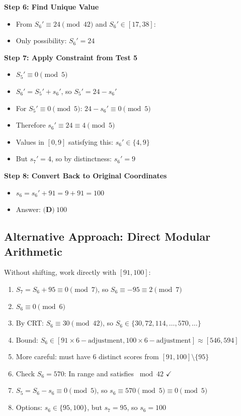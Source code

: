 \documentclass[11pt]{article}
\begin{document}
\begin{solutionbox}
\textbf{Step 6: Find Unique Value}
\begin{itemize}
    \item From $S_6' \equiv 24 \pmod{42}$ and $S_6' \in [17, 38]$:
    \item Only possibility: $S_6' = 24$
\end{itemize}

\textbf{Step 7: Apply Constraint from Test 5}
\begin{itemize}
    \item $S_5' \equiv 0 \pmod{5}$
    \item $S_6' = S_5' + s_6'$, so $S_5' = 24 - s_6'$
    \item For $S_5' \equiv 0 \pmod{5}$: $24 - s_6' \equiv 0 \pmod{5}$
    \item Therefore $s_6' \equiv 24 \equiv 4 \pmod{5}$
    \item Values in $[0, 9]$ satisfying this: $s_6' \in \{4, 9\}$
    \item But $s_7' = 4$, so by distinctness: $s_6' = 9$
\end{itemize}

\textbf{Step 8: Convert Back to Original Coordinates}
\begin{itemize}
    \item $s_6 = s_6' + 91 = 9 + 91 = 100$
    \item Answer: $\boxed{\textbf{(D)}\ 100}$
\end{itemize}

\subsection*{Alternative Approach: Direct Modular Arithmetic}

Without shifting, work directly with $[91, 100]$:
\begin{enumerate}
    \item $S_7 = S_6 + 95 \equiv 0 \pmod{7}$, so $S_6 \equiv -95 \equiv 2 \pmod{7}$
    \item $S_6 \equiv 0 \pmod{6}$
    \item By CRT: $S_6 \equiv 30 \pmod{42}$, so $S_6 \in \{30, 72, 114, \ldots, 570, \ldots\}$
    \item Bound: $S_6 \in [91 \times 6 - \text{adjustment}, 100 \times 6 - \text{adjustment}] \approx [546, 594]$
    \item More careful: must have 6 distinct scores from $[91, 100] \setminus \{95\}$
    \item Check $S_6 = 570$: In range and satisfies $\bmod 42$ $\checkmark$
    \item $S_5 = S_6 - s_6 \equiv 0 \pmod{5}$, so $s_6 \equiv 570 \pmod{5} \equiv 0 \pmod{5}$
    \item Options: $s_6 \in \{95, 100\}$, but $s_7 = 95$, so $s_6 = 100$
\end{enumerate}


\end{solutionbox}
\end{document}
